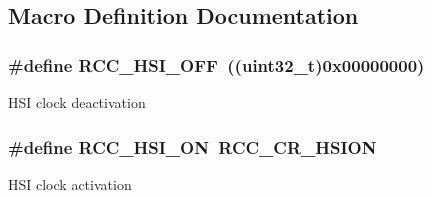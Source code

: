 \subsection{Macro Definition Documentation}
\hypertarget{group___r_c_c___h_s_i___config_ga1b34d37d3b51afec0758b3ddc7a7e665}{
\subsubsection[{R\-C\-C\-\_\-\-H\-S\-I\-\_\-\-O\-F\-F}]{\setlength{\rightskip}{0pt plus 5cm}\#define R\-C\-C\-\_\-\-H\-S\-I\-\_\-\-O\-F\-F~((uint32\-\_\-t)0x00000000)}}\label{group___r_c_c___h_s_i___config_ga1b34d37d3b51afec0758b3ddc7a7e665}
H\-S\-I clock deactivation \hypertarget{group___r_c_c___h_s_i___config_ga0bf09ef9e46d5da25cced7b3122f92f5}{
\subsubsection[{R\-C\-C\-\_\-\-H\-S\-I\-\_\-\-O\-N}]{\setlength{\rightskip}{0pt plus 5cm}\#define R\-C\-C\-\_\-\-H\-S\-I\-\_\-\-O\-N~{\bf R\-C\-C\-\_\-\-C\-R\-\_\-\-H\-S\-I\-O\-N}}}\label{group___r_c_c___h_s_i___config_ga0bf09ef9e46d5da25cced7b3122f92f5}
H\-S\-I clock activation 